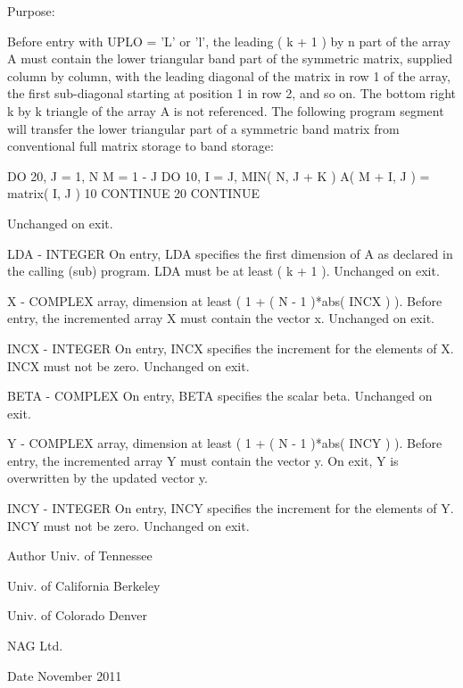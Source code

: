 \begin{DoxyParagraph}{Purpose\+: }
\begin{DoxyVerb}
           Before entry with UPLO = 'L' or 'l', the leading ( k + 1 )
           by n part of the array A must contain the lower triangular
           band part of the symmetric matrix, supplied column by
           column, with the leading diagonal of the matrix in row 1 of
           the array, the first sub-diagonal starting at position 1 in
           row 2, and so on. The bottom right k by k triangle of the
           array A is not referenced.
           The following program segment will transfer the lower
           triangular part of a symmetric band matrix from conventional
           full matrix storage to band storage:

                 DO 20, J = 1, N
                    M = 1 - J
                    DO 10, I = J, MIN( N, J + K )
                       A( M + I, J ) = matrix( I, J )
              10    CONTINUE
              20 CONTINUE

           Unchanged on exit.

  LDA    - INTEGER
           On entry, LDA specifies the first dimension of A as declared
           in the calling (sub) program. LDA must be at least
           ( k + 1 ).
           Unchanged on exit.

  X      - COMPLEX array, dimension at least
           ( 1 + ( N - 1 )*abs( INCX ) ).
           Before entry, the incremented array X must contain the
           vector x.
           Unchanged on exit.

  INCX   - INTEGER
           On entry, INCX specifies the increment for the elements of
           X. INCX must not be zero.
           Unchanged on exit.

  BETA   - COMPLEX
           On entry, BETA specifies the scalar beta.
           Unchanged on exit.

  Y      - COMPLEX array, dimension at least
           ( 1 + ( N - 1 )*abs( INCY ) ).
           Before entry, the incremented array Y must contain the
           vector y. On exit, Y is overwritten by the updated vector y.

  INCY   - INTEGER
           On entry, INCY specifies the increment for the elements of
           Y. INCY must not be zero.
           Unchanged on exit.\end{DoxyVerb}
 
\end{DoxyParagraph}
\begin{DoxyAuthor}{Author}
Univ. of Tennessee 

Univ. of California Berkeley 

Univ. of Colorado Denver 

N\+A\+G Ltd. 
\end{DoxyAuthor}
\begin{DoxyDate}{Date}
November 2011 
\end{DoxyDate}
\hypertarget{group__complex__eig_ga7ba73334a6847224855e1cd46190a57e}{}
